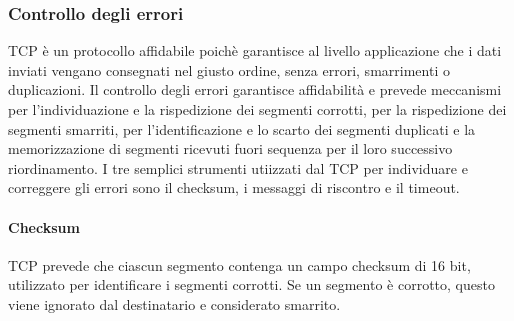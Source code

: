 \documentclass[12pt]{report}
\begin{document}
	\subsubsection{Controllo degli errori}
	TCP è un protocollo affidabile poichè garantisce al livello applicazione che i dati inviati vengano consegnati nel giusto ordine, senza errori, smarrimenti o duplicazioni. Il controllo degli errori garantisce affidabilità e prevede meccanismi per l'individuazione e la rispedizione dei segmenti corrotti, per la rispedizione dei segmenti smarriti, per l'identificazione e lo scarto dei segmenti duplicati e la memorizzazione di segmenti ricevuti fuori sequenza per il loro successivo riordinamento. I tre semplici strumenti utiizzati dal TCP per individuare e correggere gli errori sono il checksum, i messaggi di riscontro e il timeout.

	\paragraph{Checksum}
	TCP prevede che ciascun segmento contenga un campo checksum di 16 bit, utilizzato per identificare i segmenti corrotti. Se un segmento è corrotto, questo viene ignorato dal destinatario e considerato smarrito.
\end{document}
